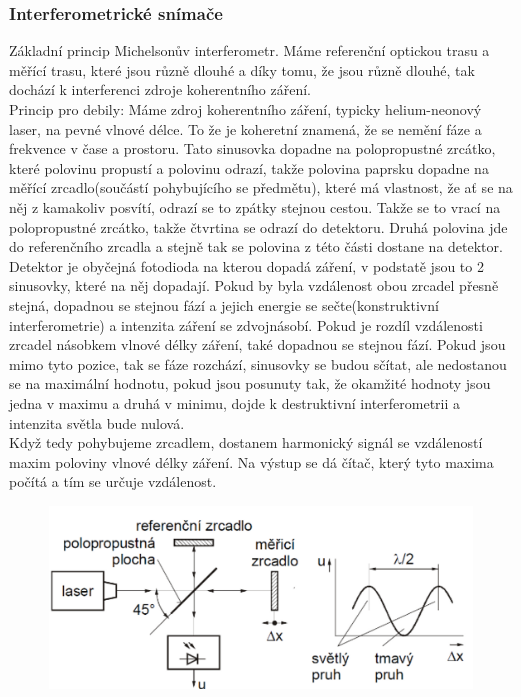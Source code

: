 \subsubsection{Interferometrické snímače}
Základní princip Michelsonův interferometr. Máme referenční optickou trasu a měřící trasu, které jsou různě dlouhé a díky tomu, že jsou různě dlouhé, tak dochází k interferenci zdroje koherentního záření. \\
Princip pro debily: Máme zdroj koherentního záření, typicky helium-neonový laser, na pevné vlnové délce. To že je koheretní znamená, že se nemění fáze a frekvence v čase a prostoru. Tato sinusovka dopadne na polopropustné zrcátko, které polovinu propustí a polovinu odrazí, takže polovina paprsku dopadne na měřící zrcadlo(součástí pohybujícího se předmětu), které má vlastnost, že ať se na něj z kamakoliv posvítí, odrazí se to zpátky stejnou cestou. Takže se to vrací na polopropustné zrcátko, takže čtvrtina se odrazí do detektoru. Druhá polovina jde do referenčního zrcadla a stejně tak se polovina z této části dostane na detektor. Detektor je obyčejná fotodioda na kterou dopadá záření, v podstatě jsou to 2 sinusovky, které na něj dopadají. Pokud by byla vzdálenost obou zrcadel přesně stejná, dopadnou se stejnou fází a jejich energie se sečte(konstruktivní interferometrie) a intenzita záření se zdvojnásobí. Pokud je rozdíl vzdálenosti zrcadel násobkem vlnové délky záření, také dopadnou se stejnou fází. Pokud jsou mimo tyto pozice, tak se fáze rozchází, sinusovky se budou sčítat, ale nedostanou se na maximální hodnotu, pokud jsou posunuty tak, že okamžité hodnoty jsou jedna v maximu a druhá v minimu, dojde k destruktivní interferometrii a intenzita světla bude nulová.\\
Když tedy pohybujeme zrcadlem, dostanem harmonický signál se vzdáleností maxim poloviny vlnové délky záření. Na výstup se dá čítač, který tyto maxima počítá a tím se určuje vzdálenost.\\
\begin{figure}[h!]
    \centering
    \includegraphics[scale = 0.2]{img/InterfSnim.png}
\end{figure}

